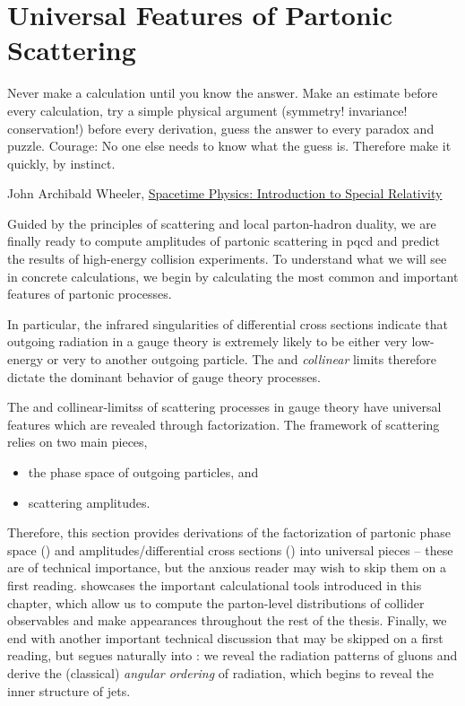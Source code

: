 \section{Universal Features of Partonic Scattering}
\label{sec:universal-features}


\epigraph{
    Never make a calculation until you know the answer.
    Make an estimate before every calculation, try a simple physical argument (symmetry! invariance! conservation!) before every derivation, guess the answer to every paradox and puzzle.
    Courage: No one else needs to know what the guess is.
    Therefore make it quickly, by instinct.
}
{
John Archibald Wheeler, \underline{Spacetime Physics: Introduction to Special Relativity}
}

Guided by the principles of scattering and local parton-hadron duality, we are finally ready to compute amplitudes of partonic scattering in \gls{pqcd} and predict the results of high-energy collision experiments.
%
To understand what we will see in concrete calculations, we begin by calculating the most common and important features of partonic processes.

In particular, the infrared singularities of differential cross sections indicate that outgoing radiation in a gauge theory is extremely likely to be either very low-energy or very  to another outgoing particle.
%
The \textit{} and \textit{collinear} limits therefore dictate the dominant behavior of gauge theory processes.

The  and \glspl{collinear-limit}s of scattering processes in gauge theory have universal features which are revealed through \gls{factorization}.
%
The framework of scattering relies on two main pieces,
\begin{itemize}
    \item
        the phase space of outgoing particles, and

    \item
        scattering amplitudes.
\end{itemize}
%
Therefore, this section provides derivations of the factorization of partonic phase space () and amplitudes/differential cross sections () into universal pieces -- these are of technical importance, but the anxious reader may wish to skip them on a first reading.
%
 showcases the important calculational tools introduced in this chapter, which allow us to compute the parton-level distributions of collider observables and make appearances throughout the rest of the thesis.
%
Finally, we end with another important technical discussion that may be skipped on a first reading, but segues naturally into :
%
we reveal the radiation patterns of  gluons and derive the (classical) \textit{angular ordering} of  radiation, which begins to reveal the inner structure of jets.

